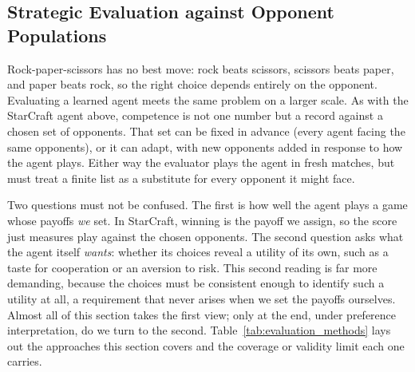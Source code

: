 \subsection{Strategic Evaluation against Opponent Populations}
\label{sec:gt4ai:evaluation}

Rock-paper-scissors has no best move: rock beats scissors, scissors beats paper, and
paper beats rock, so the right choice depends entirely on the opponent. Evaluating a
learned agent meets the same problem on a larger scale. As with the StarCraft agent
above, competence is not one number but a record against a chosen set of opponents.
That set can be fixed in advance (every agent facing the same opponents), or
it can adapt, with new opponents added in response to how the agent plays. Either way the
evaluator plays the agent in fresh matches, but must treat a finite list as a substitute for every opponent it might face.

Two questions must not be confused. The first is how well the agent plays a game
whose payoffs \emph{we} set. In StarCraft, winning is the payoff we assign, so the
score just measures play against the chosen opponents. The second question asks what
the agent itself \emph{wants}: whether its choices reveal a utility of its own, such
as a taste for cooperation or an aversion to risk. This second reading is far more
demanding, because the choices must be consistent enough to identify such a utility at all, a requirement that never
arises when we set the payoffs ourselves. Almost all
of this section takes the first view; only at the end, under preference
interpretation, do we turn to the second. Table~\ref{tab:evaluation_methods} lays out
the approaches this section covers and the coverage or validity limit each one carries.

